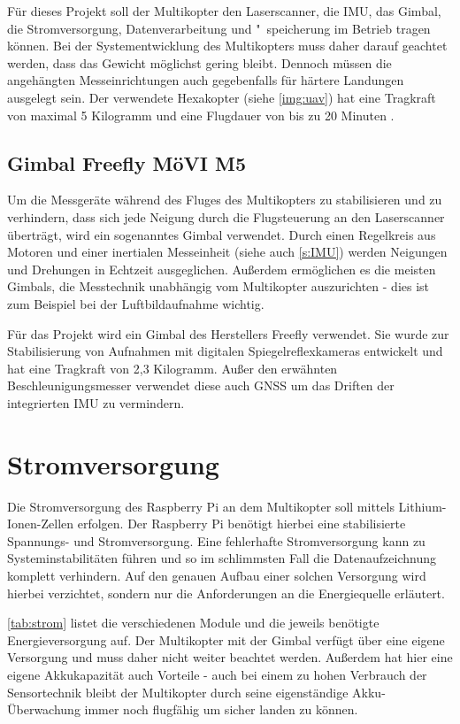 \documentclass[a4paper,12pt,bibliography=totoc, listof=totoc,titlepage,pointlessnumbers]{scrreprt}
\begin{document}
Für dieses Projekt soll der Multikopter den Laser\-scan\-ner, die IMU, das Gimbal, die Stromversorgung, Datenverarbeitung und "~speicherung im Betrieb tragen können. Bei der Systementwicklung des Multikopters muss daher darauf geachtet werden, dass das Gewicht möglichst gering bleibt. Dennoch müssen die angehängten Messeinrichtungen auch gegebenfalls für härtere Landungen ausgelegt sein. Der verwendete Hexakopter (siehe \autoref{img:uav}) hat eine Tragkraft von maximal 5 Kilogramm und eine Flugdauer von bis zu 20 Minuten \citep{Schulz}.

\subsection{Gimbal Freefly MöVI M5}
Um die Messgeräte während des Fluges des Multikopters zu stabilisieren und zu verhindern, dass sich jede Neigung durch die Flug\-steuerung an den Laser\-scan\-ner überträgt, wird ein sogenanntes Gimbal verwendet. Durch einen Regelkreis aus Motoren und einer inertialen Messeinheit (siehe auch \autoref{s:IMU}) werden Neigungen und Drehungen in Echtzeit ausgeglichen. Außerdem ermöglichen es die meisten Gimbals, die Messtechnik unabhängig vom Multikopter auszurichten - dies ist zum Beispiel bei der Luftbildaufnahme wichtig.

Für das Projekt wird ein Gimbal des Herstellers Freefly verwendet. Sie wurde zur Stabilisierung von Aufnahmen mit digitalen Spiegelreflexkameras entwickelt und hat eine Tragkraft von 2,3 Kilogramm. Außer den erwähnten Beschleunigungsmesser verwendet diese auch GNSS um das Driften der integrierten IMU zu vermindern. \citep{movim5}

\section{Stromversorgung}
Die Stromversorgung des Rasp\-berry Pi an dem Multikopter soll mittels Lithium-Ionen-Zellen erfolgen. Der Rasp\-berry Pi benötigt hierbei eine stabilisierte Spannungs- und Stromversorgung. Eine fehlerhafte Stromversorgung kann zu Systeminstabilitäten führen und so im schlimmsten Fall die Datenaufzeichnung komplett verhindern. Auf den genauen Aufbau einer solchen Versorgung wird hierbei verzichtet, sondern nur die Anforderungen an die Energiequelle erläutert.

\autoref{tab:strom} listet die verschiedenen Module und die jeweils benötigte Energieversorgung auf. Der Multikopter mit der Gimbal verfügt über eine eigene Versorgung und muss daher nicht weiter beachtet werden. Außerdem hat hier eine eigene Akkukapazität auch Vorteile - auch bei einem zu hohen Verbrauch der Sensortechnik bleibt der Multikopter durch seine eigenständige Akku-Überwachung immer noch flugfähig um sicher landen zu können.
\end{document}
